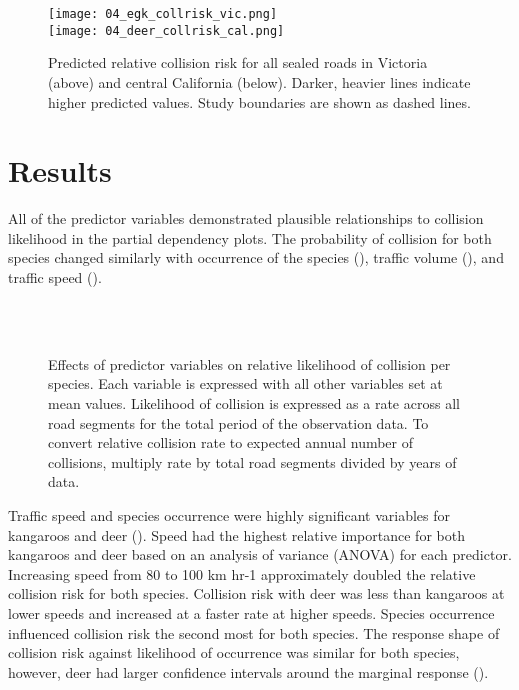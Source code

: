 \begin{figure*}[htp]
  \centering
  \texttt{[image: 04\_egk\_collrisk\_vic.png]}\\
  \texttt{[image: 04\_deer\_collrisk\_cal.png]}
  \caption[]{Predicted relative collision risk for all sealed roads in Victoria (above) and central California (below).  Darker, heavier lines indicate higher predicted values. Study boundaries are shown as dashed lines.}
  \label{cal_coll_preds}
\end{figure*}

\section{Results}

All of the predictor variables demonstrated plausible relationships to collision likelihood in the partial dependency plots. The probability of collision for both species changed similarly with occurrence of the species (), traffic volume (), and traffic speed ().

\begin{figure*}[htp]
  \captionsetup[subfloat]{farskip=-2pt,nearskip=-2pt}
  \centering
  \\
  \\
  \caption[]{Effects of predictor variables on relative likelihood of collision per species.  Each variable is expressed with all other variables set at mean values.  Likelihood of collision is expressed as a rate across all road segments for the total period of the observation data.  To convert relative collision rate to expected annual number of collisions, multiply rate by total road segments divided by years of data.}
  \label{cal_coll_effects}
\end{figure*}

Traffic speed and species occurrence were highly significant variables for kangaroos and deer (). Speed had the highest relative importance for both kangaroos and deer based on an analysis of variance (ANOVA) for each predictor. Increasing speed from 80 to 100 km hr-1 approximately doubled the relative collision risk for both species.  Collision risk with deer was less than kangaroos at lower speeds and increased at a faster rate at higher speeds. Species occurrence influenced collision risk the second most for both species.  The response shape of collision risk against likelihood of occurrence was similar for both species, however, deer had larger confidence intervals around the marginal response ().

